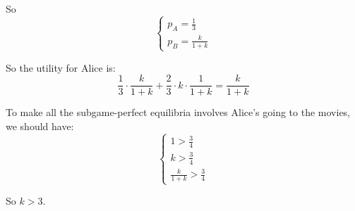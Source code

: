 \documentclass{article}
\begin{document}
    So
    $$
    \begin{cases}
        p_A=\frac{1}{3}\\
        p_B=\frac{k}{1+k}
    \end{cases}
    $$

    So the utility for Alice is:
    $$
    \frac{1}{3}\cdot\frac{k}{1+k}+\frac{2}{3}\cdot k\cdot\frac{1}{1+k}=\frac{k}{1+k}
    $$

    To make all the subgame-perfect equilibria involves Alice’s going to the movies, we should have:
    $$
    \begin{cases}
        1>\frac{3}{4}\\
        k>\frac{3}{4}\\
        \frac{k}{1+k}>\frac{3}{4}
    \end{cases}
    $$

    So $k>3$.
\end{document}
